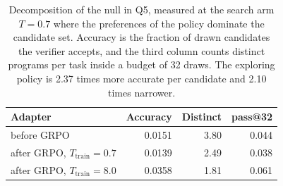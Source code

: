 \begin{table}[!tbh]
\centering\footnotesize\setlength{\tabcolsep}{4pt}
\begin{tabular}{|l|r|r|r|}
\hline
\textbf{Adapter} & \textbf{Accuracy} & \textbf{Distinct} & \textbf{pass@32} \\
\hline
before GRPO & 0.0151 & 3.80 & 0.044 \\ \hline
after GRPO, $T_{\text{train}}=0.7$ & 0.0139 & 2.49 & 0.038 \\ \hline
after GRPO, $T_{\text{train}}=8.0$ & 0.0358 & 1.81 & 0.061 \\ \hline
\end{tabular}
\caption{Decomposition of the null in Q5, measured at the search arm $T=0.7$ where
the preferences of the policy dominate the candidate set. Accuracy is the fraction
of drawn candidates the verifier accepts, and the third column counts distinct
programs per task inside a budget of 32 draws. The exploring policy is 2.37 times
more accurate per candidate and 2.10 times narrower.}
\label{tab:mechanism}
\end{table}
